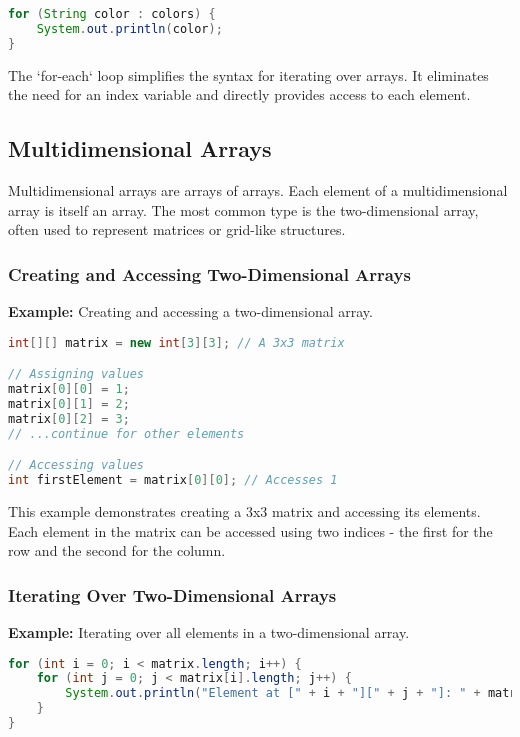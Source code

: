 \documentclass{article}
\begin{document}
\begin{lstlisting}[language=Java]
for (String color : colors) {
    System.out.println(color);
}
\end{lstlisting}

The `for-each` loop simplifies the syntax for iterating over arrays. It eliminates the need for an index variable and directly provides access to each element.



\newpage
\subsection{Multidimensional Arrays}
Multidimensional arrays are arrays of arrays. Each element of a multidimensional array is itself an array. The most common type is the two-dimensional array, often used to represent matrices or grid-like structures.

\subsubsection{Creating and Accessing Two-Dimensional Arrays}
\textbf{Example:} Creating and accessing a two-dimensional array.

\begin{lstlisting}[language=Java]
int[][] matrix = new int[3][3]; // A 3x3 matrix

// Assigning values
matrix[0][0] = 1;
matrix[0][1] = 2;
matrix[0][2] = 3;
// ...continue for other elements

// Accessing values
int firstElement = matrix[0][0]; // Accesses 1
\end{lstlisting}

This example demonstrates creating a 3x3 matrix and accessing its elements. Each element in the matrix can be accessed using two indices - the first for the row and the second for the column.

\subsubsection{Iterating Over Two-Dimensional Arrays}
\textbf{Example:} Iterating over all elements in a two-dimensional array.

\begin{lstlisting}[language=Java]
for (int i = 0; i < matrix.length; i++) {
    for (int j = 0; j < matrix[i].length; j++) {
        System.out.println("Element at [" + i + "][" + j + "]: " + matrix[i][j]);
    }
}
\end{lstlisting}
\end{document}
